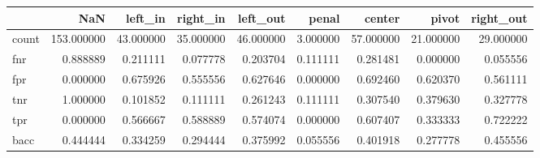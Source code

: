 \begin{tabular}{lrrrrrrrr}
\toprule
{} &         NaN &    left\_in &   right\_in &   left\_out &     penal &     center &      pivot &  right\_out \\
\midrule
count &  153.000000 &  43.000000 &  35.000000 &  46.000000 &  3.000000 &  57.000000 &  21.000000 &  29.000000 \\
fnr   &    0.888889 &   0.211111 &   0.077778 &   0.203704 &  0.111111 &   0.281481 &   0.000000 &   0.055556 \\
fpr   &    0.000000 &   0.675926 &   0.555556 &   0.627646 &  0.000000 &   0.692460 &   0.620370 &   0.561111 \\
tnr   &    1.000000 &   0.101852 &   0.111111 &   0.261243 &  0.111111 &   0.307540 &   0.379630 &   0.327778 \\
tpr   &    0.000000 &   0.566667 &   0.588889 &   0.574074 &  0.000000 &   0.607407 &   0.333333 &   0.722222 \\
bacc  &    0.444444 &   0.334259 &   0.294444 &   0.375992 &  0.055556 &   0.401918 &   0.277778 &   0.455556 \\
\bottomrule
\end{tabular}
